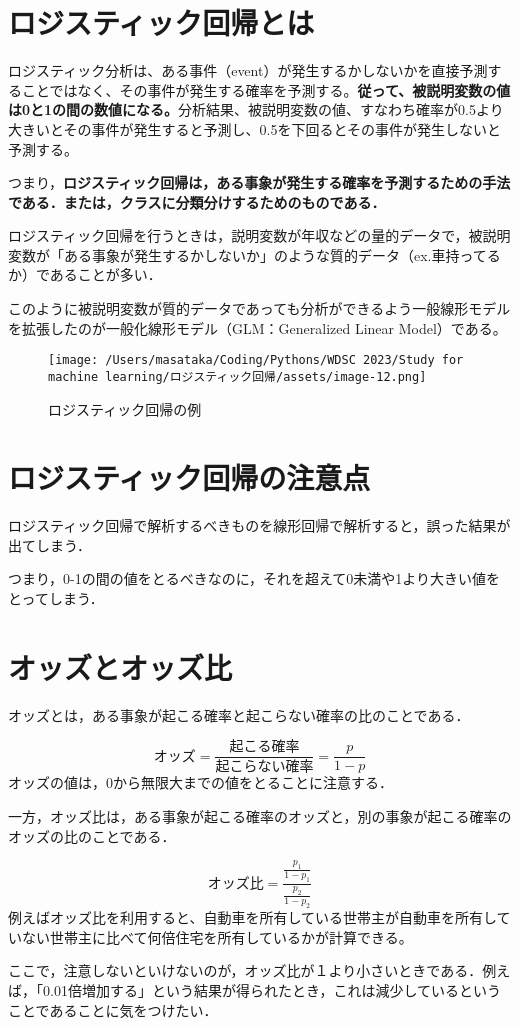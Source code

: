 \documentclass[a4paper,upLaTeX,luatex,12pt]{ltjsarticle}
\begin{document}
\section{ロジスティック回帰とは}
ロジスティック分析は、ある事件（event）が発生するかしないかを直接予測することではなく、その事件が発生する確率を予測する。\textbf{従って、被説明変数の値は0と1の間の数値になる。}分析結果、被説明変数の値、すなわち確率が0.5より大きいとその事件が発生すると予測し、0.5を下回るとその事件が発生しないと予測する。\par
つまり，\textbf{ロジスティック回帰は，ある事象が発生する確率を予測するための手法である．または，クラスに分類分けするためのものである．}\par
ロジスティック回帰を行うときは，説明変数が年収などの量的データで，被説明変数が「ある事象が発生するかしないか」のような質的データ（ex.車持ってるか）であることが多い．\par
このように被説明変数が質的データであっても分析ができるよう一般線形モデルを拡張したのが一般化線形モデル（GLM：Generalized Linear Model）である。
\begin{figure}[htbp]
  \centering
  \texttt{[image: /Users/masataka/Coding/Pythons/WDSC 2023/Study for machine learning/ロジスティック回帰/assets/image-12.png]}
  \caption{ロジスティック回帰の例}
  \label{fig:}
\end{figure}
\section{ロジスティック回帰の注意点}
ロジスティック回帰で解析するべきものを線形回帰で解析すると，誤った結果が出てしまう．\par
つまり，0-1の間の値をとるべきなのに，それを超えて0未満や1より大きい値をとってしまう．\par
\section{オッズとオッズ比}
オッズとは，ある事象が起こる確率と起こらない確率の比のことである．\par
\begin{equation}
  オッズ=\frac{起こる確率}{起こらない確率}= \frac{p}{1-p}
\end{equation}
オッズの値は，0から無限大までの値をとることに注意する．\par
一方，オッズ比は，ある事象が起こる確率のオッズと，別の事象が起こる確率のオッズの比のことである．\par
\begin{equation}
  オッズ比=\frac{\frac{p_1}{1-p_1}}{\frac{p_2}{1-p_2}}
\end{equation}
例えばオッズ比を利用すると、自動車を所有している世帯主が自動車を所有していない世帯主に比べて何倍住宅を所有しているかが計算できる。\par
ここで，注意しないといけないのが，オッズ比が１より小さいときである．例えば，「0.01倍増加する」という結果が得られたとき，これは減少しているということであることに気をつけたい．\par
\end{document}
